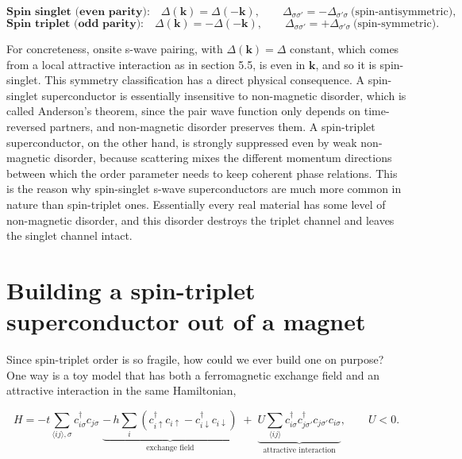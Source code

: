 \begin{equation*}
\textbf{Spin singlet (even parity):} \quad \Delta(\mathbf k) = \Delta(-\mathbf k), \qquad \Delta_{\sigma\sigma'} = -\Delta_{\sigma'\sigma}\ \text{(spin-antisymmetric)},
\end{equation*}
\begin{equation}
\textbf{Spin triplet (odd parity):} \quad \Delta(\mathbf k) = -\Delta(-\mathbf k), \qquad \Delta_{\sigma\sigma'} = +\Delta_{\sigma'\sigma}\ \text{(spin-symmetric)}.
\end{equation}

For concreteness, onsite s-wave pairing, with $\Delta(\mathbf k) = \Delta$ constant, which comes
from a local attractive interaction as in section 5.5, is even in $\mathbf k$, and so it is
spin-singlet. This symmetry classification has a direct physical consequence. A spin-singlet
superconductor is essentially insensitive to non-magnetic disorder, which is called Anderson's
theorem, since the pair wave function only depends on time-reversed partners, and non-magnetic
disorder preserves them. A spin-triplet superconductor, on the other hand, is strongly suppressed
even by weak non-magnetic disorder, because scattering mixes the different momentum directions
between which the order parameter needs to keep coherent phase relations. This is the reason why
spin-singlet s-wave superconductors are much more common in nature than spin-triplet ones.
Essentially every real material has some level of non-magnetic disorder, and this disorder destroys
the triplet channel and leaves the singlet channel intact.

\section{Building a spin-triplet superconductor out of a magnet}

Since spin-triplet order is so fragile, how could we ever build one on purpose? One way is a toy
model that has both a ferromagnetic exchange field and an attractive interaction in the same
Hamiltonian,

\begin{equation*}
H = -t\sum_{\langle ij\rangle,\sigma}c_{i\sigma}^\dagger c_{j\sigma} \;\underbrace{-\, h\sum_i \left(c_{i\uparrow}^\dagger c_{i\uparrow} - c_{i\downarrow}^\dagger c_{i\downarrow}\right)}_{\text{exchange field}} \;+\; \underbrace{U\sum_{\langle ij\rangle} c_{i\sigma}^\dagger c_{j\sigma'}^\dagger c_{j\sigma'}c_{i\sigma}}_{\text{attractive interaction}}, \qquad U<0.
\end{equation*}

